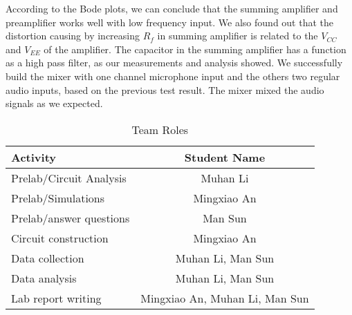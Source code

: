 According to the Bode plots, we can conclude that the summing amplifier and preamplifier works well with low frequency input. We also found out that the distortion causing by increasing $R_f$ in summing amplifier is related to the $V_{CC}$ and $V_{EE}$ of the amplifier. The capacitor in the summing amplifier has a function as a high pass filter, as our measurements and analysis showed. \newline
\phantom{ } We successfully build the mixer with one channel microphone input and the others two regular audio inputs, based on the previous test result. The mixer mixed the audio signals as we expected.

\begin{table}[!htbp]
	\caption{Team Roles}
	\renewcommand\arraystretch{1.5}\centering
	\begin{tabular}{l|c}
		\hline
		\hline
		Activity					&	Student Name 	\\
		\hline
		Prelab/Circuit Analysis		& 	Muhan Li		\\
		\hline
		Prelab/Simulations			&	Mingxiao An		\\
		\hline
		Prelab/answer questions		&	Man Sun			\\
		\hline
		Circuit construction		&	Mingxiao An		\\
		\hline
		Data collection				& Muhan Li, Man Sun	\\
		\hline
		Data analysis				& Muhan Li, Man Sun \\
		\hline
		Lab report writing			& Mingxiao An, Muhan Li, Man Sun \\
		\hline
		\hline
	\end{tabular}\\
\end{table}